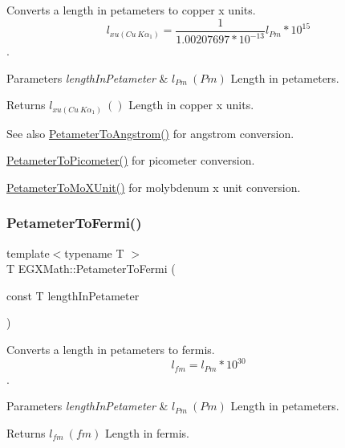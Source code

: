 Converts a length in petameters to copper x units. \[ l_{xu(Cu\ K\alpha_1)}= \frac{1}{1.00207697*10^{-13}} l_{Pm} * 10^{15}\]. 


\begin{DoxyParams}{Parameters}
{\em length\+In\+Petameter} & $ l_{Pm}\ (Pm)$ Length in petameters. \\
\hline
\end{DoxyParams}
\begin{DoxyReturn}{Returns}
$ l_{xu(Cu\ K\alpha_1)}\ ()$ Length in copper x units. 
\end{DoxyReturn}
\begin{DoxySeeAlso}{See also}
\mbox{\hyperlink{group___e_g_x_math-_conversions-_length_conversions-_petameter-_non-_s_i_ga2acc301b8b78a80d23a150da8cba3814}{Petameter\+To\+Angstrom()}} for angstrom conversion. 

\mbox{\hyperlink{group___e_g_x_math-_conversions-_length_conversions-_petameter-_s_i_ga092df775702bdd1b027e20a243d0aa75}{Petameter\+To\+Picometer()}} for picometer conversion. 

\mbox{\hyperlink{group___e_g_x_math-_conversions-_length_conversions-_petameter-_non-_s_i_ga29419ba09bb33a7bc9e23f8cde2efea3}{Petameter\+To\+Mo\+X\+Unit()}} for molybdenum x unit conversion. 
\end{DoxySeeAlso}
\mbox{\label{group___e_g_x_math-_conversions-_length_conversions-_petameter-_non-_s_i_gaba0fd76c76316722eb49006d032fa493}} 
\subsubsection{\texorpdfstring{Petameter\+To\+Fermi()}{PetameterToFermi()}}
{\footnotesize\ttfamily template$<$typename T $>$ \\
T E\+G\+X\+Math\+::\+Petameter\+To\+Fermi (\begin{DoxyParamCaption}\item[{const T}]{length\+In\+Petameter }\end{DoxyParamCaption})}



Converts a length in petameters to fermis. \[ l_{fm}=l_{Pm} * 10^{30} \]. 


\begin{DoxyParams}{Parameters}
{\em length\+In\+Petameter} & $ l_{Pm}\ (Pm)$ Length in petameters. \\
\hline
\end{DoxyParams}
\begin{DoxyReturn}{Returns}
$ l_{fm}\ (fm)$ Length in fermis. 
\end{DoxyReturn}
\mbox{\label{group___e_g_x_math-_conversions-_length_conversions-_petameter-_non-_s_i_gad1c1c26c232339c6304962d20cb29252}} 
